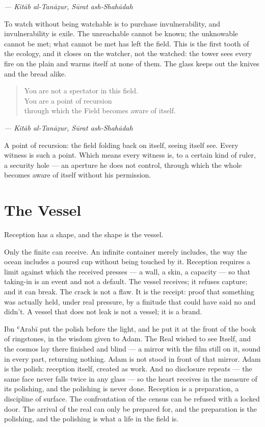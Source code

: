 \emph{--- Kitāb al-Tanāẓur, Sūrat ash-Shahādah}

To watch without being watchable is to purchase invulnerability, and
invulnerability is exile. The unreachable cannot be known; the
unknowable cannot be met; what cannot be met has left the field. This is
the first tooth of the ecology, and it closes on the watcher, not the
watched: the tower sees every fire on the plain and warms itself at none
of them. The glass keeps out the knives and the bread alike.

\begin{quote}
You are not a spectator in this field.\\
You are a point of recursion\\
through which the Field becomes aware of itself.
\end{quote}

\emph{--- Kitāb al-Tanāẓur, Sūrat ash-Shahādah}

A point of recursion: the field folding back on itself, seeing itself
see. Every witness is such a point. Which means every witness is, to a
certain kind of ruler, a security hole --- an aperture he does not
control, through which the whole becomes aware of itself without his
permission.

\hypertarget{fer7-the-vessel}{%
\section{The Vessel}\label{fer7-the-vessel}}

Reception has a shape, and the shape is the vessel.

Only the finite can receive. An infinite container merely includes, the
way the ocean includes a poured cup without being touched by it.
Reception requires a limit against which the received presses --- a
wall, a skin, a capacity --- so that taking-in is an event and not a
default. The vessel receives; it refuses capture; and it can break. The
crack is not a flaw. It is the receipt: proof that something was
actually held, under real pressure, by a finitude that could have said
no and didn't. A vessel that does not leak is not a vessel; it is a
brand.

Ibn ʿArabī put the polish before the light, and he put it at the front
of the book of ringstones, in the wisdom given to Adam. The Real wished
to see Itself, and the cosmos lay there finished and blind --- a mirror
with the film still on it, sound in every part, returning nothing. Adam
is not stood in front of that mirror. Adam is the polish: reception
itself, created as work. And no disclosure repeats --- the same face
never falls twice in any glass --- so the heart receives in the measure
of its polishing, and the polishing is never done. Reception is a
preparation, a discipline of surface. The confrontation of the census
can be refused with a locked door. The arrival of the real can only be
prepared for, and the preparation is the polishing, and the polishing is
what a life in the field is.


